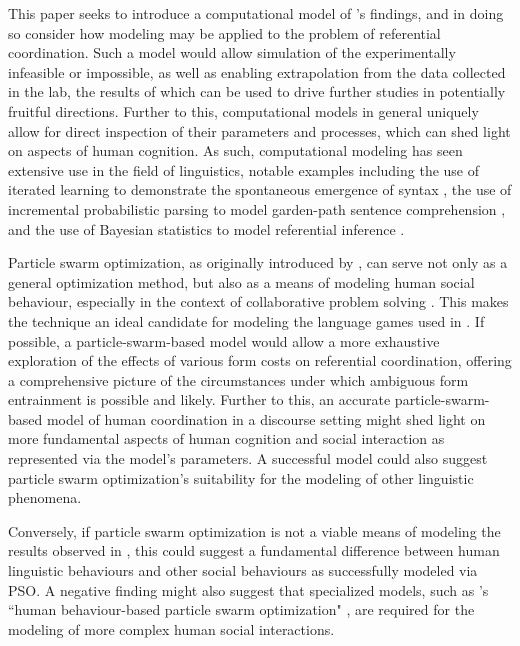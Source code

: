 \documentclass[12pt,a4paper]{article}
\begin{document}
This paper seeks to introduce a computational model of \citeauthor{rohde2012}'s findings, and in doing so consider how modeling may be applied to the problem of referential coordination. Such a model would allow simulation of the experimentally infeasible or impossible, as well as enabling extrapolation from the data collected in the lab, the results of which can be used to drive further studies in potentially fruitful directions. Further to this, computational models in general uniquely allow for direct inspection of their parameters and processes, which can shed light on aspects of human cognition. As such, computational modeling has seen extensive use in the field of linguistics, notable examples including the use of iterated learning to demonstrate the spontaneous emergence of syntax \citep{kirby2002}, the use of incremental probabilistic parsing to model garden-path sentence comprehension \citep{hale2001}, and the use of Bayesian statistics to model referential inference \citep{frank2012}.

Particle swarm optimization, as originally introduced by \citet*{kennedy1995}, can serve not only as a general optimization method, but also as a means of modeling human social behaviour, especially in the context of collaborative problem solving \citep{kennedy1997}. This makes the technique an ideal candidate for modeling the language games used in \citeauthor{rohde2012}. If possible, a particle-swarm-based model would allow a more exhaustive exploration of the effects of various form costs on referential coordination, offering a comprehensive picture of the circumstances under which ambiguous form entrainment is possible and likely. Further to this, an accurate particle-swarm-based model of human coordination in a discourse setting might shed light on more fundamental aspects of human cognition and social interaction as represented via the model's parameters. A successful model could also suggest particle swarm optimization's suitability for the modeling of other linguistic phenomena. 

Conversely, if particle swarm optimization is not a viable means of modeling the results observed in \citeauthor{rohde2012}, this could suggest a fundamental difference between human linguistic behaviours and other social behaviours as successfully modeled via PSO. A negative finding might also suggest that specialized models, such as \citeauthor{liu2014}'s ``human behaviour-based particle swarm optimization" \citeyearpar{liu2014}, are required for the modeling of more complex human social interactions.
\end{document}
